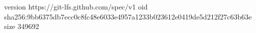 version https://git-lfs.github.com/spec/v1
oid sha256:9bb6375db7ecc0c8fc48e6033e4957a1233b023612e0419de5d212f27c63b63e
size 349692
